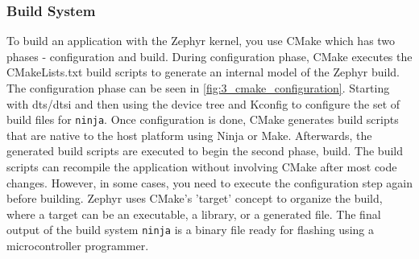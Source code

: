 \subsubsection{Build System}
To build an application with the Zephyr kernel, you use CMake which has two phases - configuration and build. During configuration phase, CMake executes the CMakeLists.txt build scripts to generate an internal model of the Zephyr build. The configuration phase can be seen in \cref{fig:3_cmake_configuration}. Starting with \gls{dts}/\gls{dtsi} and then using the device tree and Kconfig to configure the set of build files for \texttt{ninja}. Once configuration is done, CMake generates build scripts that are native to the host platform using Ninja or Make. Afterwards, the generated build scripts are executed to begin the second phase, build. The build scripts can recompile the application without involving CMake after most code changes. However, in some cases, you need to execute the configuration step again before building. Zephyr uses CMake’s 'target' concept to organize the build, where a target can be an executable, a library, or a generated file. The final output of the build system \texttt{ninja} is a binary file ready for \gls{flashing} using a microcontroller programmer.

